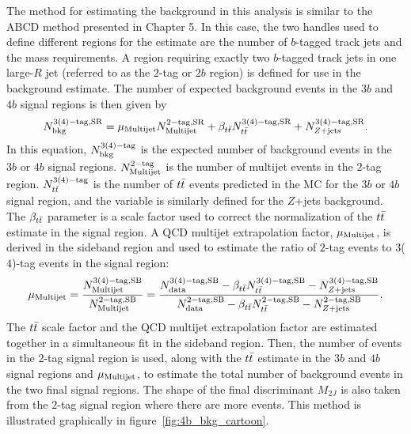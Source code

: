 The method for estimating the background in this analysis is similar to the ABCD method presented in Chapter 5. In this case, the two handles used to define different regions for the estimate are the number of $b$-tagged track jets and the mass requirements. A region requiring exactly two $b$-tagged track jets in one large-$R$ jet (referred to as the $2$-tag or $2b$ region) is defined for use in the background estimate. The number of expected background events in the $3b$ and $4b$ signal regions is then given by 
%
\begin{equation}
\label{eqn:4b_bkg}
N_{\rm bkg}^{\rm 3(4)-tag, SR} = \mu_{\rm Multijet} N_{\rm Multijet}^{\rm 2-tag, SR} + \beta_{t\bar{t}} N_{t\bar{t}}^{\rm 3(4)-tag, SR} + N_{Z+ \rm jets}^{\rm 3(4)-tag, SR}.
\end{equation}
%
In this equation, $N_{\rm bkg}^{\rm 3(4)-tag}$ is the expected number of background events in the $3b$ or $4b$ signal regions. $N_{\rm Multijet}^{\rm 2-tag}$ is the number of multijet events in the $2$-tag region. $N_{t\bar{t}}^{\rm 3(4)-tag}$ is the number of $t\bar{t}$ events predicted in the MC for the $3b$ or $4b$ signal region, and the variable is similarly defined for the $Z$+jets background. The $\beta_{t\bar{t}}$ parameter is a scale factor used to correct the normalization of the $t\bar{t}$ estimate in the signal region. A QCD multijet extrapolation factor, $\mu_{\rm Multijet}$, is derived in the sideband region and used to estimate the ratio of $2$-tag events to $3$($4$)-tag events in the signal region:
%
\begin{equation}
\label{eqn:4bmu}
\mu_{\rm Multijet} = \frac{N_{\rm Multijet}^{\rm 3(4)-tag, SB}}{N_{\rm Multijet}^{\rm 2-tag, SB}} = \frac{N_{\rm data}^{\rm 3(4)-tag, SB} - \beta_{t\bar{t}} N_{t\bar{t}}^{\rm 3(4)-tag, SB} - N_{Z+ \rm jets}^{\rm 3(4)-tag, SB}}{N_{\rm data}^{\rm 2-tag, SB} - \beta_{t\bar{t}} N_{t\bar{t}}^{\rm 2-tag, SB} - N_{Z+ \rm jets}^{\rm 2-tag, SB}}.
\end{equation}
%
The $t\bar{t}$ scale factor and the QCD multijet extrapolation factor are estimated together in a simultaneous fit in the sideband region. Then, the number of events in the $2$-tag signal region is used, along with the $t\bar{t}$ estimate in the $3b$ and $4b$ signal regions and $\mu_{\rm Multijet}$, to estimate the total number of background events in the two final signal regions. The shape of the final discriminant $M_{2J}$ is also taken from the $2$-tag signal region where there are more events. This method is illustrated graphically in figure~\ref{fig:4b_bkg_cartoon}.
%
